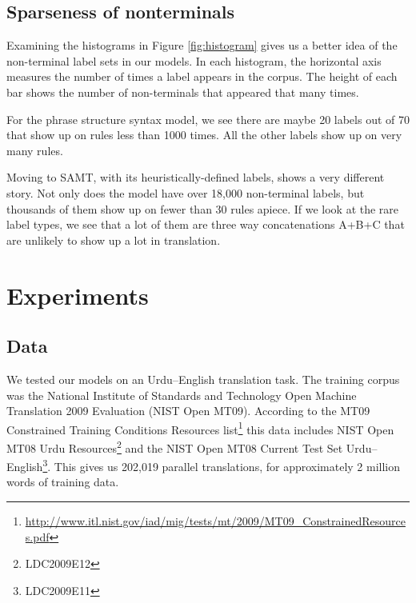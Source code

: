 \documentclass[a4paper]{article}
\begin{document}



\subsection{Sparseness of nonterminals}

Examining the histograms in Figure \ref{fig:histogram} gives us a better idea of the non-terminal label sets in our models. In each histogram, the horizontal axis measures the number of times a label appears in the corpus. The height of each bar shows the number of non-terminals that appeared that many times. %

For the phrase structure syntax model, we see there are maybe 20 labels out of 70 that show up on rules less than 1000 times. All the other labels show up on very many rules.

Moving to SAMT, with its heuristically-defined labels, shows a very different story. Not only does the model have over 18,000 non-terminal labels, but thousands of them show up on fewer than 30 rules apiece. If we look at the rare label types, we see that a lot of them are three way concatenations A+B+C that are unlikely to show up a lot in translation. 

\section{Experiments}

\subsection{Data}

We tested our models on an Urdu--English translation task. The training corpus was the National Institute of Standards and Technology Open Machine Translation 2009 Evaluation (NIST Open MT09). According to the MT09 Constrained Training Conditions Resources list\footnote{\url{http://www.itl.nist.gov/iad/mig/tests/mt/2009/MT09_ConstrainedResources.pdf}} this data includes NIST Open MT08 Urdu Resources\footnote{LDC2009E12} and the NIST Open MT08 Current Test Set Urdu--English\footnote{LDC2009E11}. This gives us 202,019 parallel translations, for approximately 2 million words of training data.
\end{document}

